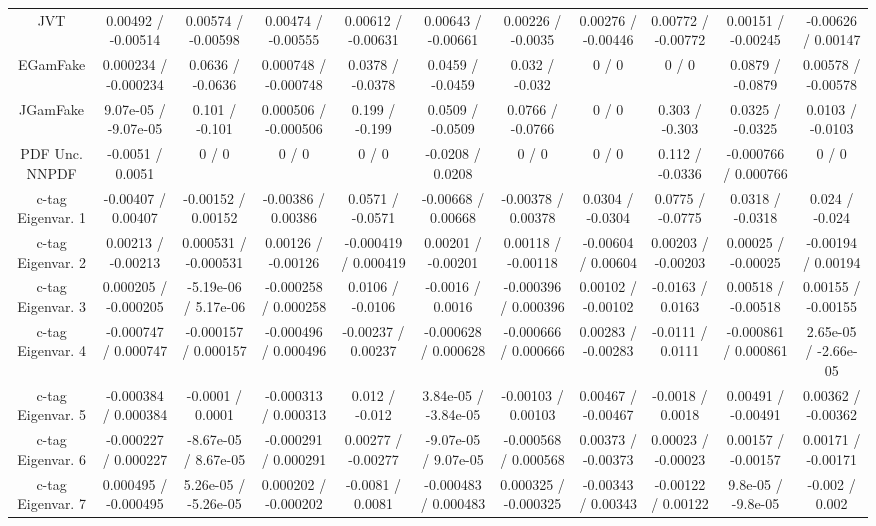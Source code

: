 \begin{table}[htbp]
\begin{center}
\begin{tabular}{|c|c|c|c|c|c|c|c|c|c|c|}
  JVT & 0.00492 / -0.00514 & 0.00574 / -0.00598 & 0.00474 / -0.00555 & 0.00612 / -0.00631 & 0.00643 / -0.00661 & 0.00226 / -0.0035 & 0.00276 / -0.00446 & 0.00772 / -0.00772 & 0.00151 / -0.00245 & -0.00626 / 0.00147 \\ 
  EGamFake & 0.000234 / -0.000234 & 0.0636 / -0.0636 & 0.000748 / -0.000748 & 0.0378 / -0.0378 & 0.0459 / -0.0459 & 0.032 / -0.032 & 0 / 0 & 0 / 0 & 0.0879 / -0.0879 & 0.00578 / -0.00578 \\ 
  JGamFake & 9.07e-05 / -9.07e-05 & 0.101 / -0.101 & 0.000506 / -0.000506 & 0.199 / -0.199 & 0.0509 / -0.0509 & 0.0766 / -0.0766 & 0 / 0 & 0.303 / -0.303 & 0.0325 / -0.0325 & 0.0103 / -0.0103 \\ 
  PDF Unc. NNPDF & -0.0051 / 0.0051 & 0 / 0 & 0 / 0 & 0 / 0 & -0.0208 / 0.0208 & 0 / 0 & 0 / 0 & 0.112 / -0.0336 & -0.000766 / 0.000766 & 0 / 0 \\ 
  c-tag Eigenvar. 1 & -0.00407 / 0.00407 & -0.00152 / 0.00152 & -0.00386 / 0.00386 & 0.0571 / -0.0571 & -0.00668 / 0.00668 & -0.00378 / 0.00378 & 0.0304 / -0.0304 & 0.0775 / -0.0775 & 0.0318 / -0.0318 & 0.024 / -0.024 \\ 
  c-tag Eigenvar. 2 & 0.00213 / -0.00213 & 0.000531 / -0.000531 & 0.00126 / -0.00126 & -0.000419 / 0.000419 & 0.00201 / -0.00201 & 0.00118 / -0.00118 & -0.00604 / 0.00604 & 0.00203 / -0.00203 & 0.00025 / -0.00025 & -0.00194 / 0.00194 \\ 
  c-tag Eigenvar. 3 & 0.000205 / -0.000205 & -5.19e-06 / 5.17e-06 & -0.000258 / 0.000258 & 0.0106 / -0.0106 & -0.0016 / 0.0016 & -0.000396 / 0.000396 & 0.00102 / -0.00102 & -0.0163 / 0.0163 & 0.00518 / -0.00518 & 0.00155 / -0.00155 \\ 
  c-tag Eigenvar. 4 & -0.000747 / 0.000747 & -0.000157 / 0.000157 & -0.000496 / 0.000496 & -0.00237 / 0.00237 & -0.000628 / 0.000628 & -0.000666 / 0.000666 & 0.00283 / -0.00283 & -0.0111 / 0.0111 & -0.000861 / 0.000861 & 2.65e-05 / -2.66e-05 \\ 
  c-tag Eigenvar. 5 & -0.000384 / 0.000384 & -0.0001 / 0.0001 & -0.000313 / 0.000313 & 0.012 / -0.012 & 3.84e-05 / -3.84e-05 & -0.00103 / 0.00103 & 0.00467 / -0.00467 & -0.0018 / 0.0018 & 0.00491 / -0.00491 & 0.00362 / -0.00362 \\ 
  c-tag Eigenvar. 6 & -0.000227 / 0.000227 & -8.67e-05 / 8.67e-05 & -0.000291 / 0.000291 & 0.00277 / -0.00277 & -9.07e-05 / 9.07e-05 & -0.000568 / 0.000568 & 0.00373 / -0.00373 & 0.00023 / -0.00023 & 0.00157 / -0.00157 & 0.00171 / -0.00171 \\ 
  c-tag Eigenvar. 7 & 0.000495 / -0.000495 & 5.26e-05 / -5.26e-05 & 0.000202 / -0.000202 & -0.0081 / 0.0081 & -0.000483 / 0.000483 & 0.000325 / -0.000325 & -0.00343 / 0.00343 & -0.00122 / 0.00122 & 9.8e-05 / -9.8e-05 & -0.002 / 0.002 \\ 

\end{tabular}
\end{center}
\end{table}
